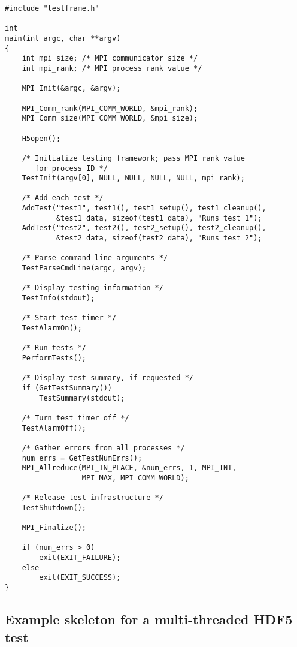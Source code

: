 \documentclass[../HDF5_RFC.tex]{subfiles}
\begin{document}
\begin{verbatim}
#include "testframe.h"

int
main(int argc, char **argv)
{
    int mpi_size; /* MPI communicator size */
    int mpi_rank; /* MPI process rank value */

    MPI_Init(&argc, &argv);

    MPI_Comm_rank(MPI_COMM_WORLD, &mpi_rank);
    MPI_Comm_size(MPI_COMM_WORLD, &mpi_size);

    H5open();

    /* Initialize testing framework; pass MPI rank value
       for process ID */
    TestInit(argv[0], NULL, NULL, NULL, NULL, mpi_rank);

    /* Add each test */
    AddTest("test1", test1(), test1_setup(), test1_cleanup(),
            &test1_data, sizeof(test1_data), "Runs test 1");
    AddTest("test2", test2(), test2_setup(), test2_cleanup(),
            &test2_data, sizeof(test2_data), "Runs test 2");

    /* Parse command line arguments */
    TestParseCmdLine(argc, argv);

    /* Display testing information */
    TestInfo(stdout);

    /* Start test timer */
    TestAlarmOn();

    /* Run tests */
    PerformTests();

    /* Display test summary, if requested */
    if (GetTestSummary())
        TestSummary(stdout);

    /* Turn test timer off */
    TestAlarmOff();

    /* Gather errors from all processes */
    num_errs = GetTestNumErrs();
    MPI_Allreduce(MPI_IN_PLACE, &num_errs, 1, MPI_INT,
                  MPI_MAX, MPI_COMM_WORLD);

    /* Release test infrastructure */
    TestShutdown();

    MPI_Finalize();

    if (num_errs > 0)
        exit(EXIT_FAILURE);
    else
        exit(EXIT_SUCCESS);
}
\end{verbatim}

\subsection{\textbf{Example skeleton for a multi-threaded HDF5 test}}
\label{apdx:multithread_example}
\end{document}

